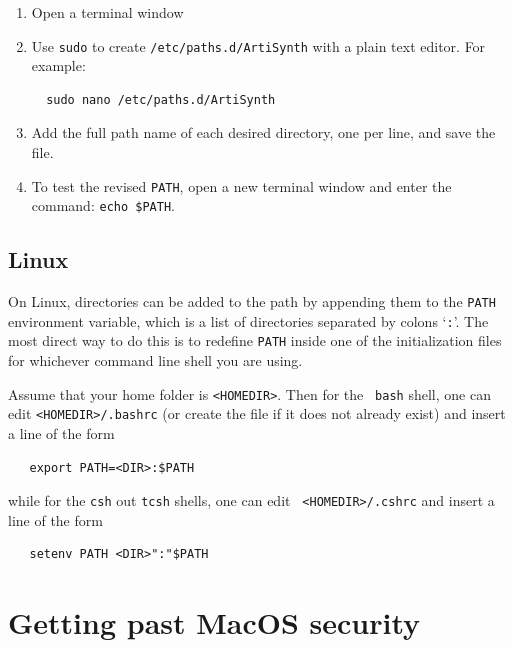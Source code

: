 \documentclass{article}
\begin{document}
\begin{enumerate}

\item Open a terminal window

\item Use {\tt sudo} to create {\tt /etc/paths.d/ArtiSynth} with a plain
text editor. For example:
\begin{verbatim}
  sudo nano /etc/paths.d/ArtiSynth
\end{verbatim}

\item Add the full path name of each desired directory, one per line,
and save the file.

\item To test the revised {\tt PATH}, open a new terminal
window and enter the command: {\tt echo \$PATH}.

\end{enumerate}

\subsection{Linux}
\label{Linux}

On Linux, directories can be added to the path by appending them to
the {\tt PATH} environment variable, which is a list of directories
separated by colons `{\tt :}'. The most direct way to do this is to
redefine {\tt PATH} inside one of the initialization files for
whichever command line shell you are using.

Assume that your home folder is {\tt <HOMEDIR>}. Then for the {\tt
bash} shell, one can edit {\tt <HOMEDIR>/.bashrc} (or create the file
if it does not already exist) and insert a line of the form
\begin{verbatim}
   export PATH=<DIR>:$PATH
\end{verbatim}
while for the {\tt csh} out {\tt tcsh} shells, one can edit {\tt
<HOMEDIR>/.cshrc} and insert a line of the form
\begin{verbatim}
   setenv PATH <DIR>":"$PATH
\end{verbatim}

\section{Getting past MacOS security}
\label{MacOSSecurity}
\end{document}
